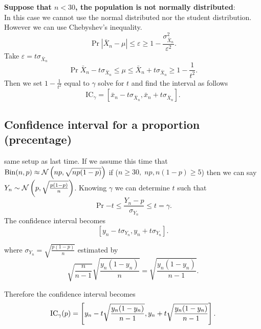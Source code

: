 \documentclass{report}
\begin{document}
\begin{enumerate}
	\ii \textbf{Suppose that $n<30$, the population is not normally distributed}:\\
	In this case we cannot use the normal distributed nor the student distribution. However we can use Chebyshev's inequality.
	\[
		\Pr{|\bar{X}_n-\mu|\leq\varepsilon}\geq 1 -\frac{\sigma_{\bar{X}_n}^2}{\varepsilon^2}
		.\]
	Take $\varepsilon=t\sigma_{\bar{X}_n}$
	\[
		\Pr{\bar{X}_n-t\sigma_{\bar{X}_n} \leq \mu \leq \bar{X}_n+t\sigma_{\bar{X}_n}} \geq 1-\frac{1}{t^2}
		.\]
	Then we set $1-\frac{1}{t^2}$ equal to $\gamma$ solve for $t$ and find the interval as follows
	\[
		\mathrm{IC}_\gamma = [\bar{x}_n-t\sigma_{\bar{X}_n},\bar{x}_n+t\sigma_{\bar{X}_n}]
		.\]
\end{enumerate}

\subsection{Confidence interval for a proportion (precentage)}

same setup as last time. If we assume this time that $\mathrm{Bin}(n,p)\approx \mathcal{N}\left(np,\sqrt{np(1-p)}\right)$ if ($n\geq30,\;np,n(1-p)\geq5$) then we can say $Y_n\sim\mathcal{N}\left(p,\sqrt{\frac{p(1-p)}{n}}\right)$. Knowing $\gamma$ we can determine $t$ such that
\[
	\Pr{-t\leq \frac{Y_n-p}{\sigma_{Y_n}}\leq t}=\gamma
	.\]
The confidence interval becomes
\[
	[y_n-t\sigma_{Y_n}, y_n+t\sigma_{Y_n}]
	.\]

where $\sigma_{Y_n}=\sqrt{\frac{p(1-p)}{n}}$ estimated by
\[
	\sqrt{\frac{n}{n-1}}\sqrt{\frac{y_n(1-y_n)}{n}}=\sqrt{\frac{y_n(1-y_n)}{n-1}}
	.\]

Therefore the confidence interval becomes
\[
	\mathrm{IC}_\gamma(p)=\left[y_n-t\sqrt{\frac{y_n(1-y_n)}{n-1}}, y_n+t\sqrt{\frac{y_n(1-y_n)}{n-1}}\right]
	.\]

\end{document}
